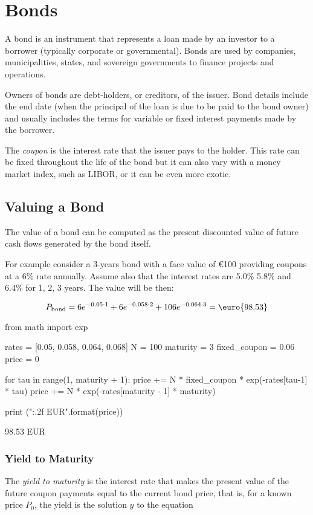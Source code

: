 \chapter{Bonds}
\label{bonds}

A bond is an instrument that represents a loan made by an investor to a borrower (typically corporate or governmental). Bonds are used by companies, municipalities, states, and sovereign governments to finance projects and operations. 

Owners of bonds are debt-holders, or creditors, of the issuer. Bond details include the end date (when the principal of the loan is due to be paid to the bond owner) and usually includes the terms for variable or fixed interest payments made by the borrower.

The \emph{coupon} is the interest rate that the issuer pays to the holder. This rate can be fixed throughout the life of the bond but it can also vary with a money market index, such as LIBOR, or it can be even more exotic.

\section{Valuing a Bond}
\label{sec:bond_pricing}

The value of a bond can be computed as the present discounted value of future cash flows generated by the bond itself.

For example consider a 3-years bond with a face value of \euro{100} providing coupons at a 6\% rate annually. Assume also that the interest rates are 5.0\% 5.8\% and 6.4\% for 1, 2, 3 years. The value will be then:

\[P_{\mathrm{bond}}=6e^{-0.05\cdot 1}+6e^{-0.058\cdot 2}+106e^{-0.064\cdot 3} = \textrm{\euro{98.53}}\]

\begin{ipython}
from math import exp

rates = [0.05, 0.058, 0.064, 0.068]
N = 100
maturity = 3
fixed_coupon = 0.06
price = 0

for tau in range(1, maturity + 1):
    price += N * fixed_coupon * exp(-rates[tau-1] * tau)
price += N * exp(-rates[maturity - 1] * maturity)

print ("{:.2f} EUR".format(price))
\end{ipython}
\begin{ioutput}
98.53 EUR
\end{ioutput}

\subsection{Yield to Maturity}
The \emph{yield to maturity} is the interest rate that makes the present value of the future coupon payments equal to the current bond price, that is, for a known price $P_0$, the yield is the solution $y$ to the equation

